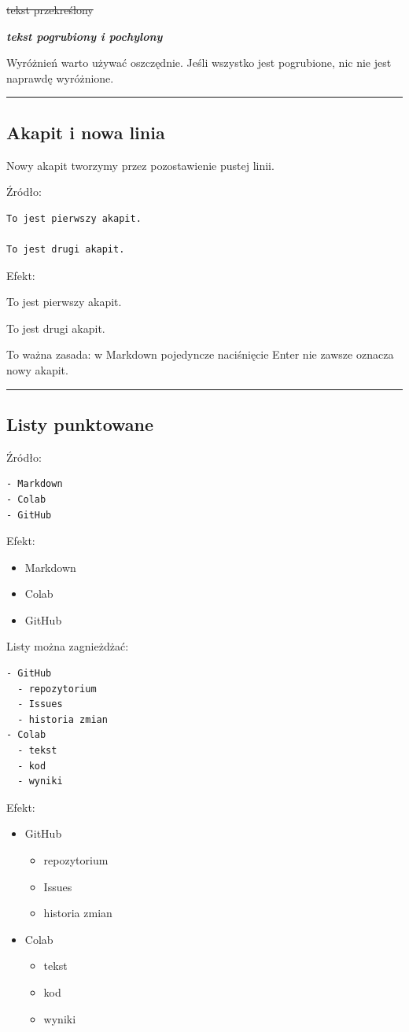\documentclass[11pt, a4paper]{article}
\begin{document}
\sout{tekst przekreślony}

\textbf{\textit{tekst pogrubiony i pochylony}}

Wyróżnień warto używać oszczędnie. Jeśli wszystko jest pogrubione, nic nie jest naprawdę wyróżnione.
\medskip\hrule\medskip

\subsection{Akapit i nowa linia}

Nowy akapit tworzymy przez pozostawienie pustej linii.

Źródło:

\begin{verbatim}
To jest pierwszy akapit.

To jest drugi akapit.
\end{verbatim}

Efekt:

To jest pierwszy akapit.

To jest drugi akapit.

To ważna zasada: w Markdown pojedyncze naciśnięcie Enter nie zawsze oznacza nowy akapit.

\medskip\hrule\medskip

\subsection{Listy punktowane}

Źródło:

\begin{verbatim}
- Markdown
- Colab
- GitHub
\end{verbatim}

Efekt:

\begin{itemize}
    \item Markdown
    \item Colab
    \item GitHub
\end{itemize}

Listy można zagnieżdżać:

\begin{verbatim}
- GitHub
  - repozytorium
  - Issues
  - historia zmian
- Colab
  - tekst
  - kod
  - wyniki
\end{verbatim}

Efekt:

\begin{itemize}
    \item GitHub
    \begin{itemize}
        \item repozytorium
        \item Issues
        \item historia zmian
    \end{itemize}
    \item Colab
    \begin{itemize}
        \item tekst
        \item kod
        \item wyniki
    \end{itemize}
\end{itemize}
\end{document}
